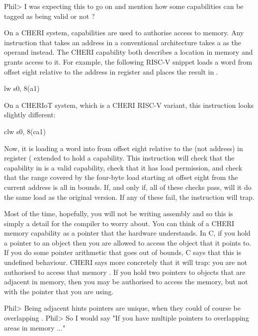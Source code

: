 Phil> I was expecting this to go on and mention how some capabilities can be tagged as being valid or not ?

On a CHERI system, capabilities are used to authorise access to memory.
Any instruction that takes an address in a conventional architecture takes a  as the operand instead.
The CHERI capability both describes a location in memory and grants access to it.
For example, the following RISC-V snippet loads a word from offset eight relative to the address in register  and places the result in .

\begin{asmsnippet}
	lw	s0, 8(a1)
\end{asmsnippet}

On a CHERIoT system, which is a CHERI RISC-V variant, this instruction looks slightly different:

\begin{asmsnippet}
	clw	s0, 8(ca1)
\end{asmsnippet}

Now, it is loading a word into  from offset eight relative to the  (not address) in register  ( extended to hold a capability.
This instruction will check that the capability in  is a valid capability, check that it has load permission, and check that the range covered by the four-byte load starting at offset eight from the current address is all in bounds.
If, and only if, all of these checks pass, will it do the same load as the original version.
If any of these fail, the instruction will trap.


Most of the time, hopefully, you will not be writing assembly and so this is simply a detail for the compiler to worry about.
You can think of a CHERI memory capability as a pointer that the hardware understands.
In C, if you hold a pointer to an object then you are allowed to access the object that it points to.
If you do some pointer arithmetic that goes out of bounds, C says that this is undefined behaviour.
CHERI says more concretely that it will trap: you are not authorised to access that memory .
If you hold two pointers to objects that are adjacent in memory, then you may be authorised to access the memory, but not with the pointer that you are using.

Phil> Being adjacent hints pointers are unique, when they could of course be overlapping .
Phil> So I would say "If you have multiple pointers to overlapping areas in memory ..."  


